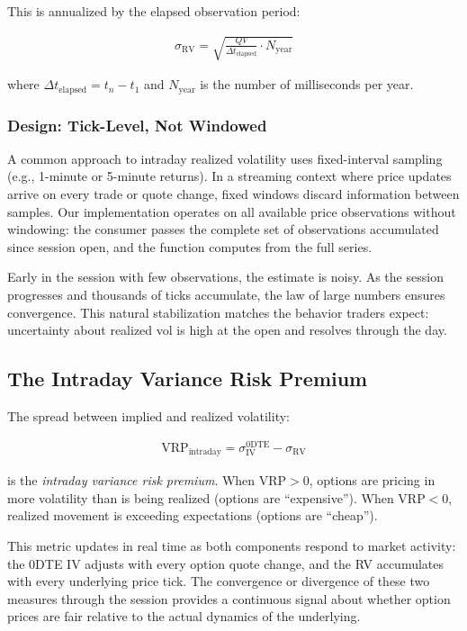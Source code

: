 \documentclass[11pt, a4paper]{article}
\begin{document}
This is annualized by the elapsed observation period:

\begin{align}
\sigma_{\text{RV}} = \sqrt{\frac{QV}{\Delta t_{\text{elapsed}}} \cdot N_{\text{year}}}
\end{align}

where $\Delta t_{\text{elapsed}} = t_n - t_1$ and $N_{\text{year}}$ is the number of milliseconds per year.

\subsubsection{Design: Tick-Level, Not Windowed}

A common approach to intraday realized volatility uses fixed-interval sampling (e.g., 1-minute or 5-minute returns). In a streaming context where price updates arrive on every trade or quote change, fixed windows discard information between samples. Our implementation operates on all available price observations without windowing: the consumer passes the complete set of observations accumulated since session open, and the function computes from the full series.

Early in the session with few observations, the estimate is noisy. As the session progresses and thousands of ticks accumulate, the law of large numbers ensures convergence. This natural stabilization matches the behavior traders expect: uncertainty about realized vol is high at the open and resolves through the day.

\subsection{The Intraday Variance Risk Premium}

The spread between implied and realized volatility:

\begin{align}
\text{VRP}_{\text{intraday}} = \sigma_{\text{IV}}^{0\text{DTE}} - \sigma_{\text{RV}}
\end{align}

is the \emph{intraday variance risk premium}. When $\text{VRP} > 0$, options are pricing in more volatility than is being realized (options are ``expensive''). When $\text{VRP} < 0$, realized movement is exceeding expectations (options are ``cheap'').

This metric updates in real time as both components respond to market activity: the 0DTE IV adjusts with every option quote change, and the RV accumulates with every underlying price tick. The convergence or divergence of these two measures through the session provides a continuous signal about whether option prices are fair relative to the actual dynamics of the underlying.
\end{document}
